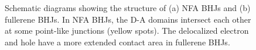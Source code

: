 \documentclass[12pt]{article}
\begin{document}
\begin{figure}[H]
\centering
{} \hspace{60 pt}
\caption{Schematic diagrams showing the structure of (a) 
NFA BHJs and (b) fullerene BHJs. In NFA BHJs, the D-A domains intersect each other at some point-like junctions (yellow spots). The delocalized electron and hole have a more extended contact area in fullerene BHJs.}
\label{fig:NFA and FA}
\end{figure}
\end{document}
